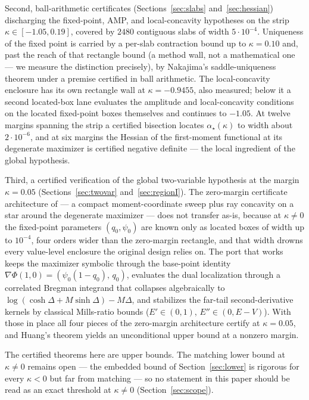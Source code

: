 \documentclass[11pt]{article}
\theoremstyle{remark}
\begin{document}
Second, ball-arithmetic certificates (Sections~\ref{sec:slabs}
and~\ref{sec:hessian}) discharging the fixed-point, AMP, and
local-concavity hypotheses on the strip $\kappa\in[-1.05,0.19]$,
covered by $2480$ contiguous slabs of width $5\cdot10^{-4}$.
Uniqueness of the fixed point is carried by a per-slab contraction
bound up to $\kappa=0.10$ and, past the reach of that rectangle bound
(a method wall, not a mathematical one --- we measure the distinction
precisely), by Nakajima's saddle-uniqueness theorem
\cite{nakajima2025} under a premise certified in ball arithmetic.
The local-concavity enclosure has its own rectangle wall at
$\kappa=-0.9455$, also measured; below it a second located-box lane
evaluates the amplitude and local-concavity conditions on the
located fixed-point boxes themselves and continues to $-1.05$.  At
twelve margins spanning the strip a certified bisection locates
$\alpha_\star(\kappa)$ to width about $2\cdot10^{-6}$, and at six
margins the Hessian of the first-moment functional at its degenerate
maximizer is certified negative definite --- the local ingredient of
the global hypothesis.

Third, a certified verification of the global two-variable hypothesis
at the margin $\kappa=0.05$ (Sections~\ref{sec:twovar}
and~\ref{sec:regionI}).  The zero-margin certificate architecture of
\cite{shmalo2026capacity} --- a compact moment-coordinate sweep plus
ray concavity on a star around the degenerate maximizer --- does not
transfer as-is, because at $\kappa\ne0$ the fixed-point parameters
$(q_0,\psi_0)$ are known only as located boxes of width up to
$10^{-4}$, four orders wider than the zero-margin rectangle, and that
width drowns every value-level enclosure the original design relies
on.  The port that works keeps the maximizer symbolic through the
base-point identity $\nabla\Phi(1,0)=(\psi_0(1-q_0),\,q_0)$, evaluates
the dual localization through a correlated Bregman integrand that
collapses algebraically to
$\log(\cosh\Delta+M\sinh\Delta)-M\Delta$, and stabilizes the far-tail
second-derivative kernels by classical Mills-ratio bounds
($E'\in(0,1)$, $E''\in(0,E-V)$).  With those in place all four pieces
of the zero-margin architecture certify at $\kappa=0.05$, and Huang's
theorem yields an unconditional upper bound at a nonzero margin.

The certified theorems here are upper bounds.  The matching lower
bound at $\kappa\ne0$ remains open --- the embedded bound of
Section~\ref{sec:lower} is rigorous for every $\kappa<0$ but far
from matching --- so no statement in this paper
should be read as an exact threshold at $\kappa\ne0$
(Section~\ref{sec:scope}).
\end{document}
